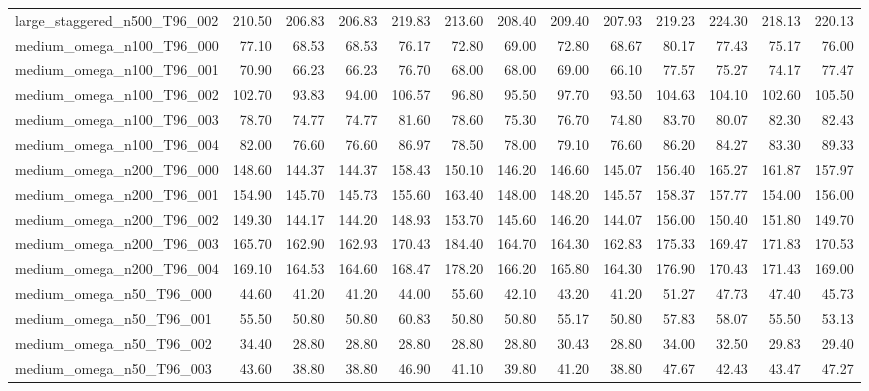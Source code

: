 \begin{table}[htbp]
\begin{tabular}{lrrrrrrrrrrrr}
large\_staggered\_n500\_T96\_002 & 210.50 & 206.83 & 206.83 & 219.83 & 213.60 & 208.40 & 209.40 & 207.93 & 219.23 & 224.30 & 218.13 & 220.13 \\
medium\_omega\_n100\_T96\_000 & 77.10 & 68.53 & 68.53 & 76.17 & 72.80 & 69.00 & 72.80 & 68.67 & 80.17 & 77.43 & 75.17 & 76.00 \\
medium\_omega\_n100\_T96\_001 & 70.90 & 66.23 & 66.23 & 76.70 & 68.00 & 68.00 & 69.00 & 66.10 & 77.57 & 75.27 & 74.17 & 77.47 \\
medium\_omega\_n100\_T96\_002 & 102.70 & 93.83 & 94.00 & 106.57 & 96.80 & 95.50 & 97.70 & 93.50 & 104.63 & 104.10 & 102.60 & 105.50 \\
medium\_omega\_n100\_T96\_003 & 78.70 & 74.77 & 74.77 & 81.60 & 78.60 & 75.30 & 76.70 & 74.80 & 83.70 & 80.07 & 82.30 & 82.43 \\
medium\_omega\_n100\_T96\_004 & 82.00 & 76.60 & 76.60 & 86.97 & 78.50 & 78.00 & 79.10 & 76.60 & 86.20 & 84.27 & 83.30 & 89.33 \\
medium\_omega\_n200\_T96\_000 & 148.60 & 144.37 & 144.37 & 158.43 & 150.10 & 146.20 & 146.60 & 145.07 & 156.40 & 165.27 & 161.87 & 157.97 \\
medium\_omega\_n200\_T96\_001 & 154.90 & 145.70 & 145.73 & 155.60 & 163.40 & 148.00 & 148.20 & 145.57 & 158.37 & 157.77 & 154.00 & 156.00 \\
medium\_omega\_n200\_T96\_002 & 149.30 & 144.17 & 144.20 & 148.93 & 153.70 & 145.60 & 146.20 & 144.07 & 156.00 & 150.40 & 151.80 & 149.70 \\
medium\_omega\_n200\_T96\_003 & 165.70 & 162.90 & 162.93 & 170.43 & 184.40 & 164.70 & 164.30 & 162.83 & 175.33 & 169.47 & 171.83 & 170.53 \\
medium\_omega\_n200\_T96\_004 & 169.10 & 164.53 & 164.60 & 168.47 & 178.20 & 166.20 & 165.80 & 164.30 & 176.90 & 170.43 & 171.43 & 169.00 \\
medium\_omega\_n50\_T96\_000 & 44.60 & 41.20 & 41.20 & 44.00 & 55.60 & 42.10 & 43.20 & 41.20 & 51.27 & 47.73 & 47.40 & 45.73 \\
medium\_omega\_n50\_T96\_001 & 55.50 & 50.80 & 50.80 & 60.83 & 50.80 & 50.80 & 55.17 & 50.80 & 57.83 & 58.07 & 55.50 & 53.13 \\
medium\_omega\_n50\_T96\_002 & 34.40 & 28.80 & 28.80 & 28.80 & 28.80 & 28.80 & 30.43 & 28.80 & 34.00 & 32.50 & 29.83 & 29.40 \\
medium\_omega\_n50\_T96\_003 & 43.60 & 38.80 & 38.80 & 46.90 & 41.10 & 39.80 & 41.20 & 38.80 & 47.67 & 42.43 & 43.47 & 47.27 \\

\end{tabular}
\end{table}
